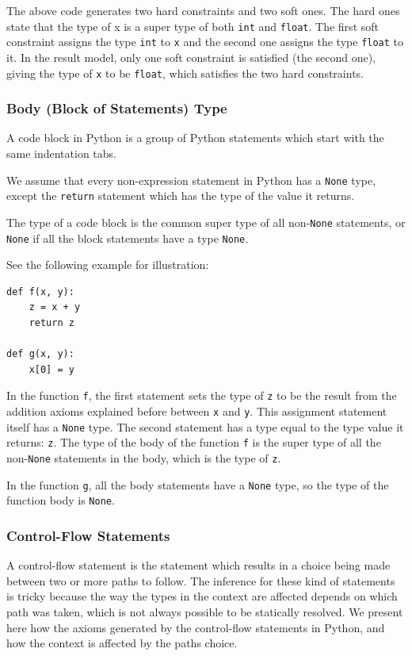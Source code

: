 The above code generates two hard constraints and two soft ones. The hard ones state that the type of x is a super type of both \lstinline|int| and \lstinline|float|. The first soft constraint assigns the type \lstinline|int| to \lstinline|x| and the second one assigns the type \lstinline|float| to it. In the result model, only one soft constraint is satisfied (the second one), giving the type of \lstinline|x| to be \lstinline|float|, which satisfies the two hard constraints.

\subsubsection{Body (Block of Statements) Type}
A code block in Python is a group of Python statements which start with the same indentation tabs.

We assume that every non-expression statement in Python has a \lstinline|None| type, except the \lstinline|return| statement which has the type of the value it returns.

The type of a code block is the common super type of all non-\lstinline|None| statements, or \lstinline|None| if all the block statements have a type \lstinline|None|.

See the following example for illustration:
\begin{lstlisting}
def f(x, y):
	z = x + y
	return z
	
def g(x, y):
	x[0] = y
\end{lstlisting}

In the function \lstinline|f|, the first statement sets the type of \lstinline|z| to be the result from the addition axioms explained before between \lstinline|x| and \lstinline|y|. This assignment statement itself has a \lstinline|None| type. The second statement has a type equal to the type value it returns: \lstinline|z|.
The type of the body of the function \lstinline|f| is the super type of all the non-\lstinline|None| statements in the body, which is the type of \lstinline|z|.

In the function \lstinline|g|, all the body statements have a \lstinline|None| type, so the type of the function body is \lstinline|None|.

\subsubsection{Control-Flow Statements}
A control-flow statement is the statement which results in a choice being made between two or more paths to follow. The inference for these kind of statements is tricky because the way the types in the context are affected depends on which path was taken, which is not always possible to be statically resolved. We present here how the axioms generated by the control-flow statements in Python, and how the context is affected by the paths choice.
